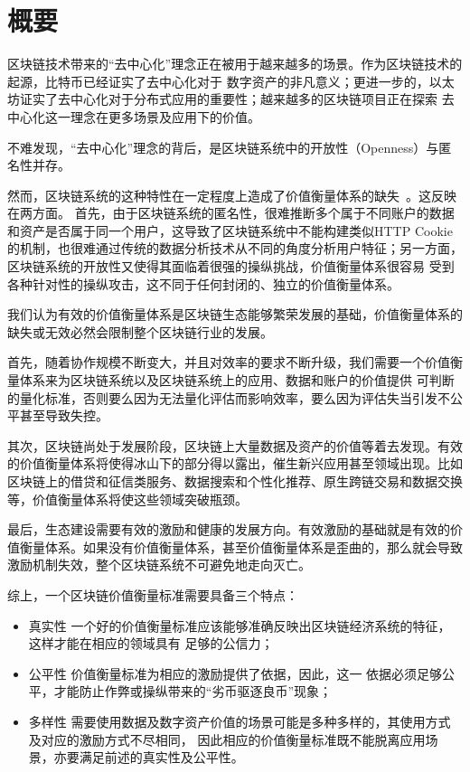 
\section{概要}

区块链技术带来的“去中心化”理念正在被用于越来越多的场景。作为区块链技术的起源，比特币已经证实了去中心化对于
数字资产的非凡意义；更进一步的，以太坊证实了去中心化对于分布式应用的重要性；越来越多的区块链项目正在探索
去中心化这一理念在更多场景及应用下的价值。

不难发现，“去中心化”理念的背后，是区块链系统中的开放性（Openness）与匿名性并存。

然而，区块链系统的这种特性在一定程度上造成了价值衡量体系的缺失~\cite{meiklejohn2013fistful}。这反映在两方面。
首先，由于区块链系统的匿名性，很难推断多个属于不同账户的数据和资产是否属于同一个用户，这导致了区块链系统中不能构建类似HTTP Cookie~\cite{Cookie}
的机制，也很难通过传统的数据分析技术从不同的角度分析用户特征；另一方面，区块链系统的开放性又使得其面临着很强的操纵挑战，价值衡量体系很容易
受到各种针对性的操纵攻击，这不同于任何封闭的、独立的价值衡量体系。

我们认为有效的价值衡量体系是区块链生态能够繁荣发展的基础，价值衡量体系的缺失或无效必然会限制整个区块链行业的发展。

首先，随着协作规模不断变大，并且对效率的要求不断升级，我们需要一个价值衡量体系来为区块链系统以及区块链系统上的应用、数据和账户的价值提供
可判断的量化标准，否则要么因为无法量化评估而影响效率，要么因为评估失当引发不公平甚至导致失控。

其次，区块链尚处于发展阶段，区块链上大量数据及资产的价值等着去发现。有效的价值衡量体系将使得冰山下的部分得以露出，催生新兴应用甚至领域出现。比如区块链上的借贷和征信类服务、数据搜索和个性化推荐、原生跨链交易和数据交换等，价值衡量体系将使这些领域突破瓶颈。

最后，生态建设需要有效的激励和健康的发展方向。有效激励的基础就是有效的价值衡量体系。如果没有价值衡量体系，甚至价值衡量体系是歪曲的，那么就会导致激励机制失效，整个区块链系统不可避免地走向灭亡。

综上，一个区块链价值衡量标准需要具备三个特点：

\begin{itemize}
\item{真实性} 一个好的价值衡量标准应该能够准确反映出区块链经济系统的特征，这样才能在相应的领域具有
足够的公信力；
\item{公平性} 价值衡量标准为相应的激励提供了依据，因此，这一
依据必须足够公平，才能防止作弊或操纵带来的“劣币驱逐良币”现象；
\item{多样性} 需要使用数据及数字资产价值的场景可能是多种多样的，其使用方式及对应的激励方式不尽相同，
因此相应的价值衡量标准既不能脱离应用场景，亦要满足前述的真实性及公平性。
\end{itemize}


